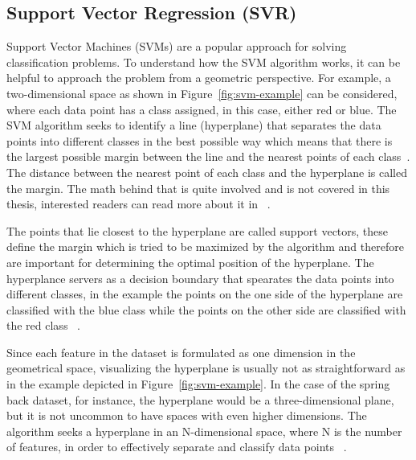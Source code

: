 \subsection{Support Vector Regression (SVR)}\label{subsec:support-vector-regression-(svr)}
Support Vector Machines (SVMs) are a popular approach for solving classification problems.
To understand how the SVM algorithm works, it can be helpful to approach the problem from a geometric perspective.
For example, a two-dimensional space as shown in Figure~\ref{fig:svm-example} can be considered, where each data point
has a class assigned, in this case, either red or blue.
The SVM algorithm seeks to identify a line (hyperplane) that separates the data points into different classes in the
best possible way which means that there is the largest possible margin between the line and the
nearest points of each class~\cite{muller_introductionmachinelearning_2016}.
The distance between the nearest point of each class and the hyperplane is called the margin.
The math behind that is quite involved and is not covered in this thesis, interested readers can read more about it
in ~\cite{hastie2009elements}.

The points that lie closest to the hyperplane are called support vectors, these define the margin which is tried to be
maximized by the algorithm and therefore are important for determining the optimal position of the hyperplane.
The hyperplance servers as a decision boundary that spearates the data points into different
classes, in the example the points on the one side of the hyperplane are classified with the blue class while the
points on
the other side are classified with the red class ~\cite[p. 42]{awad_efficientlearningmachines_2015}.

Since each feature in the dataset is formulated as one dimension in the geometrical space, visualizing the hyperplane
is usually not as straightforward as in the example depicted in Figure~\ref{fig:svm-example}.
In the case of the spring back dataset, for instance, the hyperplane would be a three-dimensional plane, but it is
not uncommon to have
spaces with even higher dimensions.
The algorithm seeks a hyperplane in an N-dimensional space, where N is the number of features, in order to
effectively separate and classify data points
~\cite[]{awad_efficientlearningmachines_2015}.

